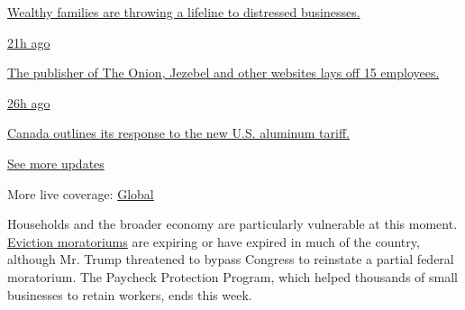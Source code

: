 \href{https://www.nytimes.com/live/2020/08/07/business/stock-market-today-coronavirus?action=click\&pgtype=Article\&state=default\&region=MAIN_CONTENT_1\&context=storylines_live_updates\#wealthy-families-are-throwing-a-lifeline-to-distressed-businesses}{Wealthy
families are throwing a lifeline to distressed businesses.}

\href{https://www.nytimes.com/live/2020/08/07/business/stock-market-today-coronavirus?action=click\&pgtype=Article\&state=default\&region=MAIN_CONTENT_1\&context=storylines_live_updates\#the-publisher-of-the-onion-jezebel-and-other-websites-lays-off-15-employees}{21h
ago}

\href{https://www.nytimes.com/live/2020/08/07/business/stock-market-today-coronavirus?action=click\&pgtype=Article\&state=default\&region=MAIN_CONTENT_1\&context=storylines_live_updates\#the-publisher-of-the-onion-jezebel-and-other-websites-lays-off-15-employees}{The
publisher of The Onion, Jezebel and other websites lays off 15
employees.}

\href{https://www.nytimes.com/live/2020/08/07/business/stock-market-today-coronavirus?action=click\&pgtype=Article\&state=default\&region=MAIN_CONTENT_1\&context=storylines_live_updates\#canada-outlines-its-response-to-the-new-us-aluminum-tariff}{26h
ago}

\href{https://www.nytimes.com/live/2020/08/07/business/stock-market-today-coronavirus?action=click\&pgtype=Article\&state=default\&region=MAIN_CONTENT_1\&context=storylines_live_updates\#canada-outlines-its-response-to-the-new-us-aluminum-tariff}{Canada
outlines its response to the new U.S. aluminum tariff.}

\href{https://www.nytimes.com/live/2020/08/07/business/stock-market-today-coronavirus?action=click\&pgtype=Article\&state=default\&region=MAIN_CONTENT_1\&context=storylines_live_updates}{See
more updates}

More live coverage:
\href{https://www.nytimes.com/2020/08/07/world/covid-19-news.html?action=click\&pgtype=Article\&state=default\&region=MAIN_CONTENT_1\&context=storylines_live_updates}{Global}

Households and the broader economy are particularly vulnerable at this
moment.
\href{https://www.nytimes.com/2020/08/07/business/economy/housing-economy-eviction-renters.html}{Eviction
moratoriums} are expiring or have expired in much of the country,
although Mr. Trump threatened to bypass Congress to reinstate a partial
federal moratorium. The Paycheck Protection Program, which helped
thousands of small businesses to retain workers, ends this week.

